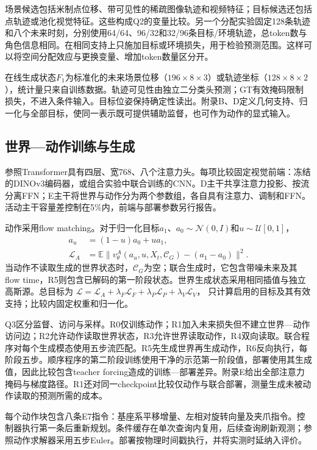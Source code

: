 场景候选包括米制点位移、带可见性的稀疏图像轨迹和视频特征；目标候选还包括点轨迹或池化视觉特征。这些构成Q2的变量比较。另一个分配实验固定128条轨迹和八个未来时刻，分别使用64/64、96/32和32/96条目标/环境轨迹，总token数与角色信息相同。在相同支持上只施加目标或环境损失，用于检验预测范围。这样可以将空间分配效应与更换变量、增加token数量区分开。

在线生成状态$F_1$为标准化的未来场景位移（$196\times8\times3$）或轨迹坐标（$128\times8\times2$），统计量只来自训练数据。轨迹可见性由独立二分类头预测；GT有效掩码限制损失，不进入条件输入。目标位姿保持确定性读出。附录B、D定义几何支持、归一化与全部目标，使同一表示既可提供辅助监督，也可作为动作的显式输入。

\subsection{世界—动作训练与生成}

参照Transformer具有四层、宽768、八个注意力头。每项比较固定视觉前端：冻结的DINOv3编码器\cite{dinov3}，或组合实验中联合训练的CNN。D主干共享注意力投影、按流分离FFN；E主干将世界与动作分为两个参数组，各自具有注意力、调制和FFN。活动主干容量差控制在5\%内，前端与部署参数另行报告。

动作采用flow matching\cite{flowmatching}。对于归一化目标$a_1$、$a_0\sim\mathcal N(0,I)$和$u\sim\mathcal U[0,1]$，
\begin{equation}
\begin{aligned}
a_u&=(1-u)a_0+ua_1,\\
\mathcal L_A&=\mathbb E\|v_\theta^A(a_u,u,X_t,\mathcal C_G)-(a_1-a_0)\|^2.
\end{aligned}
\end{equation}
当动作不读取生成的世界状态时，$\mathcal C_G$为空；联合生成时，它包含带噪未来及其flow time，R5则包含已解码的第一阶段状态。世界生成状态采用相同插值与独立高斯源。总目标为
$\mathcal L=\mathcal L_A+\lambda_F\mathcal L_F+
\lambda_P\mathcal L_P+\lambda_V\mathcal L_V$，
只计算启用的目标及其有效支持；比较内固定权重和归一化。

Q3区分监督、访问与采样。R0仅训练动作；R1加入未来损失但不建立世界—动作访问边；R2允许动作读取世界状态，R3允许世界读取动作，R4双向读取。联合程序对每个生成模态使用五步流匹配。R5先生成世界再生成动作，R6反向执行，每阶段五步。顺序程序的第二阶段训练使用干净的示范第一阶段值，部署使用其生成值，因此比较包含teacher forcing造成的训练—部署差异。附录E给出全部注意力掩码与梯度路径。R1还对同一checkpoint比较仅动作与联合部署，测量生成未被动作读取的预测所需的成本。

每个动作块包含八条E7指令：基座系平移增量、左相对旋转向量及夹爪指令。控制器执行第一条后重新规划。条件缓存在单次查询内复用，后续查询刷新观测；参照动作求解器采用五步Euler。部署按物理时间戳执行，并将实测时延纳入评价。

